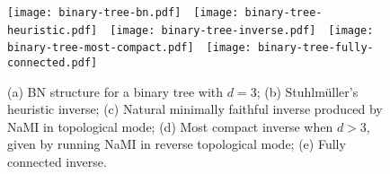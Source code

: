 \begin{figure}[t]
  \centering
  \subcaptionbox{\label{fig:binary-tree-bn}}%
  {\texttt{[image: binary-tree-bn.pdf]}}%
  \,\,%
  \subcaptionbox{\label{fig:binary-tree-heuristic}}%
  {\texttt{[image: binary-tree-heuristic.pdf]}}%
  \,\,%
  \subcaptionbox{\label{fig:binary-tree-inverse}}%
  {\texttt{[image: binary-tree-inverse.pdf]}}%
  \,\,%
  \subcaptionbox{\label{fig:binary-tree-most-compact}}%
  {\texttt{[image: binary-tree-most-compact.pdf]}}%
  \,\,%
  \subcaptionbox{\label{fig:binary-tree-fully-connected}}%
  {\texttt{[image: binary-tree-fully-connected.pdf]}}%
	\caption{(a) BN structure for a binary tree with $d=3$; (b) Stuhlm{\"u}ller's heuristic inverse; (c) Natural minimally faithful inverse produced by NaMI in topological mode; (d) Most compact inverse when $d>3$, given by running NaMI in reverse topological mode; (e) Fully connected inverse.}
  \label{fig:bn-graphs}
\end{figure}